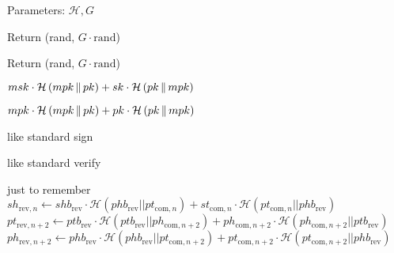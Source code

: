     Parameters: $\mathcal{H}, G$
    \begin{algorithmic}[0]
        \State Return (rand, $G \cdot \mathrm{rand}$)
      \EndFunction
    \end{algorithmic}

    \begin{algorithmic}[0]
        \State Return (rand, $G \cdot \mathrm{rand}$)
      \EndFunction
    \end{algorithmic}

    \begin{algorithmic}[0]
        \State \Return $msk \cdot \mathcal{H}\left(mpk \,\|\, pk\right) + sk
        \cdot \mathcal{H}\left(pk \,\|\, mpk\right)$
      \EndFunction
    \end{algorithmic}

    \begin{algorithmic}[0]
        \State \Return $mpk \cdot \mathcal{H}\left(mpk \,\|\, pk\right) + pk
        \cdot \mathcal{H}\left(pk \,\|\, mpk\right)$
      \EndFunction
    \end{algorithmic}

    \begin{algorithmic}[0]
        \State like standard sign
      \EndFunction
    \end{algorithmic}

    \begin{algorithmic}[0]
        \State like standard verify
      \EndFunction
    \end{algorithmic}

    \begin{algorithmic}[0]
      \State just to remember
      \State $sh_{\mathrm{rev}, n} \gets shb_{\mathrm{rev}} \cdot
      \mathcal{H}\left(phb_{\mathrm{rev}} || pt_{\mathrm{com}, n}\right) +
      st_{\mathrm{com}, n} \cdot \mathcal{H}\left(pt_{\mathrm{com}, n} ||
      phb_{\mathrm{rev}}\right)$
      \State $pt_{\mathrm{rev}, n+2} \gets ptb_{\mathrm{rev}} \cdot
      \mathcal{H}\left(ptb_{\mathrm{rev}} || ph_{\mathrm{com}, n+2}\right) +
      ph_{\mathrm{com}, n+2} \cdot \mathcal{H}\left(ph_{\mathrm{com}, n+2} ||
      ptb_{\mathrm{rev}}\right)$
      \State $ph_{\mathrm{rev}, n+2} \gets phb_{\mathrm{rev}} \cdot
      \mathcal{H}\left(phb_{\mathrm{rev}} || pt_{\mathrm{com}, n+2}\right) +
      pt_{\mathrm{com}, n+2} \cdot \mathcal{H}\left(pt_{\mathrm{com}, n+2} ||
      phb_{\mathrm{rev}}\right)$
    \end{algorithmic}

